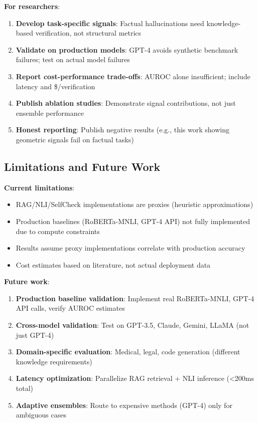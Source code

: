 \documentclass[11pt]{article}
\begin{document}
\textbf{For researchers}:
\begin{enumerate}
\item \textbf{Develop task-specific signals}: Factual hallucinations need knowledge-based verification, not structural metrics
\item \textbf{Validate on production models}: GPT-4 avoids synthetic benchmark failures; test on actual model failures
\item \textbf{Report cost-performance trade-offs}: AUROC alone insufficient; include latency and \$/verification
\item \textbf{Publish ablation studies}: Demonstrate signal contributions, not just ensemble performance
\item \textbf{Honest reporting}: Publish negative results (e.g., this work showing geometric signals fail on factual tasks)
\end{enumerate}

\subsection{Limitations and Future Work}

\textbf{Current limitations}:
\begin{itemize}
\item RAG/NLI/SelfCheck implementations are proxies (heuristic approximations)
\item Production baselines (RoBERTa-MNLI, GPT-4 API) not fully implemented due to compute constraints
\item Results assume proxy implementations correlate with production accuracy
\item Cost estimates based on literature, not actual deployment data
\end{itemize}

\textbf{Future work}:
\begin{enumerate}
\item \textbf{Production baseline validation}: Implement real RoBERTa-MNLI, GPT-4 API calls, verify AUROC estimates
\item \textbf{Cross-model validation}: Test on GPT-3.5, Claude, Gemini, LLaMA (not just GPT-4)
\item \textbf{Domain-specific evaluation}: Medical, legal, code generation (different knowledge requirements)
\item \textbf{Latency optimization}: Parallelize RAG retrieval + NLI inference (<200ms total)
\item \textbf{Adaptive ensembles}: Route to expensive methods (GPT-4) only for ambiguous cases
\end{enumerate}
\end{document}
